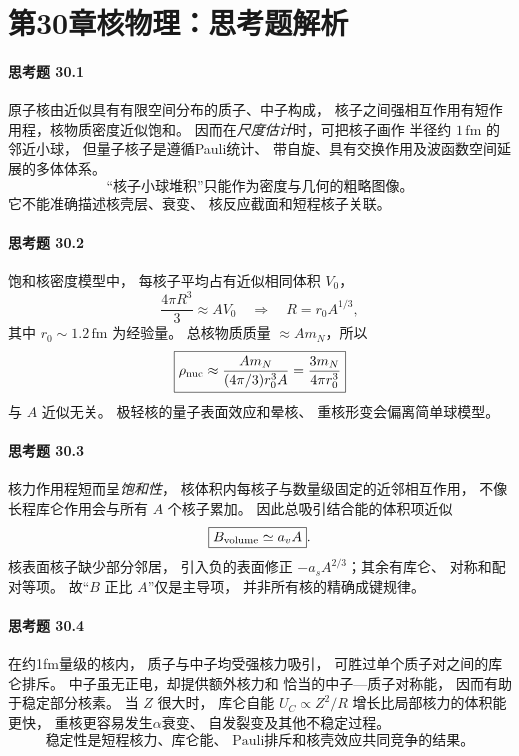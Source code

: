 \section*{第30章\quad 核物理：思考题解析}
\paragraph{思考题 30.1}
原子核由近似具有有限空间分布的质子、中子构成，
核子之间强相互作用有短作用程，核物质密度近似饱和。
因而在\emph{尺度估计}时，可把核子画作
半径约 \(1\,\mathrm{fm}\) 的邻近小球，
但量子核子是遵循Pauli统计、
带自旋、具有交换作用及波函数空间延展的多体体系。
\[
\boxed{\text{“核子小球堆积”只能作为密度与几何的粗略图像。}}
\]
它不能准确描述核壳层、衰变、
核反应截面和短程核子关联。

\paragraph{思考题 30.2}
饱和核密度模型中，
每核子平均占有近似相同体积 \(V_0\)，
\[
\frac{4\pi R^3}3\approx AV_0
\quad\Longrightarrow\quad
\boxed{R=r_0A^{1/3}},
\]
其中 \(r_0\sim1.2\,\mathrm{fm}\) 为经验量。
总核物质质量 \(\approx Am_N\)，所以
\[
\boxed{\rho_{\rm nuc}\approx
\frac{Am_N}{(4\pi/3)r_0^3A}
=\frac{3m_N}{4\pi r_0^3}}
\]
与 \(A\) 近似无关。
极轻核的量子表面效应和晕核、
重核形变会偏离简单球模型。

\paragraph{思考题 30.3}
核力作用程短而呈\emph{饱和性}，
核体积内每核子与数量级固定的近邻相互作用，
不像长程库仑作用会与所有 \(A\) 个核子累加。
因此总吸引结合能的体积项近似
\[
\boxed{B_{\rm volume}\simeq a_vA}.
\]
核表面核子缺少部分邻居，
引入负的表面修正
\(-a_sA^{2/3}\)；其余有库仑、
对称和配对等项。
故“\(B\) 正比 \(A\)”仅是主导项，
并非所有核的精确成键规律。

\paragraph{思考题 30.4}
在约1fm量级的核内，
质子与中子均受强核力吸引，
可胜过单个质子对之间的库仑排斥。
中子虽无正电，却提供额外核力和
恰当的中子—质子对称能，
因而有助于稳定部分核素。
当 \(Z\) 很大时，
库仑自能 \(U_C\propto Z^2/R\)
增长比局部核力的体积能更快，
重核更容易发生\(\alpha\)衰变、
自发裂变及其他不稳定过程。
\[
\boxed{\text{稳定性是短程核力、库仑能、
Pauli排斥和核壳效应共同竞争的结果。}}
\]

